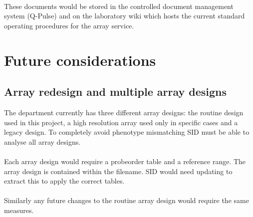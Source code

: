 \paragraph*{}
These documents would be stored in the controlled document management system (Q-Pulse) and on the laboratory wiki which hosts the current standard operating procedures for the array service.

\section{Future considerations}
\subsection{Array redesign and multiple array designs}
The department currently has three different array designs: the routine design used in this project, a high resolution array used only in specific cases and a legacy design. To completely avoid phenotype mismatching SID must be able to analyse all array designs. 
\paragraph*{}
Each array design would require a probeorder table and a reference range. The array design is contained within the filename. SID would need updating to extract this to apply the correct tables.
\paragraph*{}
Similarly any future changes to the routine array design would require the same measures.